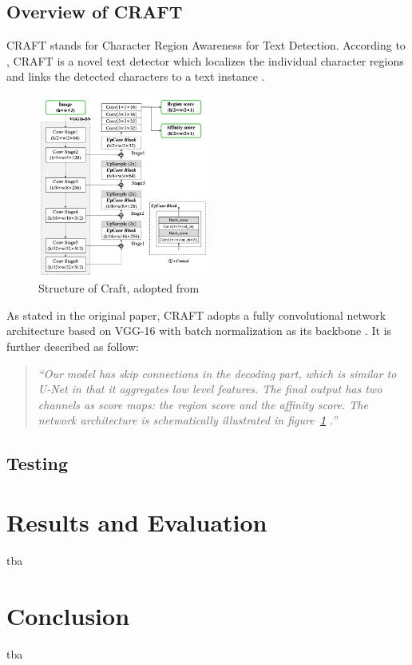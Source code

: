 \documentclass[10pt, a4paper]{article}
\begin{document}
\clearpage

\subsection{Overview of CRAFT} %
\label{sub:overviewcraft}
CRAFT stands for Character Region Awareness for Text Detection. According to \cite{CraftBaekEtAl}, CRAFT is a novel text detector which localizes the individual character regions and links the detected characters to a text instance \citep{CraftBaekEtAl}.
\begin{figure}[h!]
	\centering
	\includegraphics[width=0.5\textwidth]{img/craftstructure.png}
	\caption{Structure of Craft, adopted from~\protect\cite{CraftBaekEtAl}}
	\label{fig:craft1}
\end{figure}

As stated in the original paper, CRAFT adopts a fully convolutional network architecture based on VGG-16 \citep{vgg} with batch normalization as its backbone \citep{CraftBaekEtAl}.
It is further described as follow:
\begin{quotation}
	\emph{``Our model has skip connections in the decoding part, which is similar to U-Net \citep{unet} in that it aggregates low level features. The final output has two channels as score maps: the region score and the affinity score.
	The network architecture is schematically illustrated in figure~\ref{fig:craft1} \citep{CraftBaekEtAl}.''}
\end{quotation}

\subsection{Testing} %
\label{sub:testing}

\section{Results and Evaluation} %
\label{sec:evaluation}
tba

\section{Conclusion} %
\label{sec:conclusion}
tba

\newpage 


\end{document}

